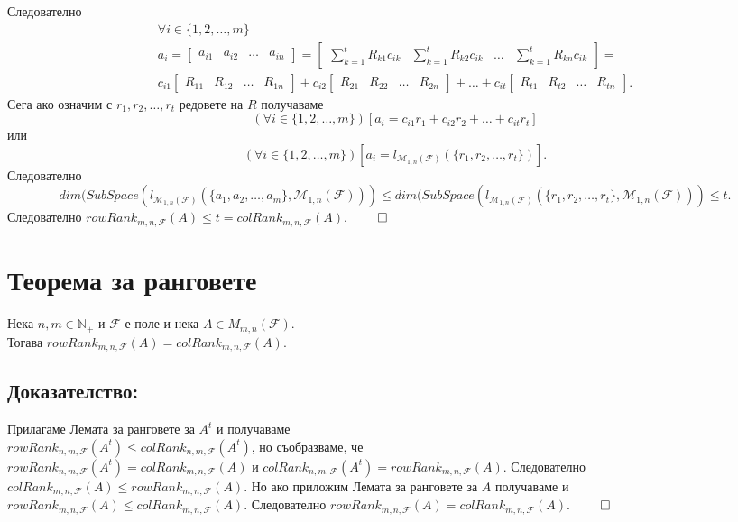 \documentclass[a4paper,9pt]{extarticle}
\newcommand{\Nat}{\mathbb{N}}
\newcommand{\F}{\mathcal{F}}
\begin{document}
Следователно
\begin{align*}
    \forall i \in \{1, 2, \dots, m\} \\
    a_i = \begin{bmatrix}
        a_{i1} &
        a_{i2} &
        \hdots &
        a_{in}
    \end{bmatrix} =
    \begin{bmatrix}
        \displaystyle\sum_{k = 1}^t R_{k1} c_{ik} &
        \displaystyle\sum_{k = 1}^t R_{k2} c_{ik} &
        \hdots &
        \displaystyle\sum_{k = 1}^t R_{kn} c_{ik}
    \end{bmatrix} = \\
    c_{i1} \begin{bmatrix}
        R_{11} & R_{12} & \hdots & R_{1n}
    \end{bmatrix}
    + c_{i2} \begin{bmatrix}
        R_{21} & R_{22} & \hdots & R_{2n}
    \end{bmatrix}
    + \dots + 
    c_{it} \begin{bmatrix}
        R_{t1} & R_{t2} & \hdots & R_{tn}
    \end{bmatrix}.
\end{align*}
Сега ако означим с \(r_1, r_2, \dots, r_t\) редовете на \(R\) получаваме
\[(\forall i \in \{1, 2, \dots, m\})[a_i = c_{i1} r_1 + c_{i2} r_2 + \dots + c_{it} r_t ]\]
или
\[(\forall i \in \{1, 2, \dots, m\})[a_i = l_{\mathcal{M}_{1, n}(\F)}(\{r_1, r_2, \dots, r_t\})].\]
Следователно \[dim(SubSpace(l_{\mathcal{M}_{1, n}(\F)}(\{a_1, a_2, \dots, a_m\}, \mathcal{M}_{1, n}(\F))) \leq dim(SubSpace(l_{\mathcal{M}_{1, n}(\F)}(\{r_1, r_2, \dots, r_t\}, \mathcal{M}_{1, n}(\F))) \leq t.\]
Следователно  \(rowRank_{m, n, \F}(A) \leq t = colRank_{m, n, \F}(A)\). \(\qed\)

\section{Теорема за ранговете}
Нека \(n, m \in \Nat_+\) и \(\F\) е поле и нека \(A \in M_{m, n}(\F)\). \\
Тогава \(rowRank_{m, n, \F}(A) = colRank_{m, n, \F}(A)\).

\subsection{Доказателство:}
Прилагаме Лемата за ранговете за \(A^t\) и получаваме \\
\(rowRank_{n, m, \F}(A^t) \leq colRank_{n, m, \F}(A^t)\), но съобразваме, че \\
\(rowRank_{n, m, \F}(A^t) = colRank_{m, n, \F}(A)\) и \(colRank_{n, m, \F}(A^t) = rowRank_{m, n, \F}(A)\).
Следователно \(colRank_{m, n, \F}(A) \leq rowRank_{m, n, \F}(A)\).
Но ако приложим Лемата за ранговете за \(A\) получаваме и \(rowRank_{m, n, \F}(A) \leq colRank_{m, n, \F}(A)\).
Следователно \(rowRank_{m, n, \F}(A) = colRank_{m, n, \F}(A)\). \(\qed\)
\end{document}
